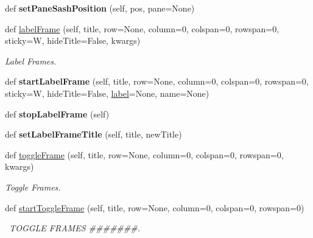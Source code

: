 \begin{DoxyCompactItemize}
def {\bfseries set\+Pane\+Sash\+Position} (self, pos, pane=None)
\item 
\mbox{\label{classappjar_1_1gui_a74ad839ae0a3437fc45379b16d98c878}} 
def \hyperlink{classappjar_1_1gui_a74ad839ae0a3437fc45379b16d98c878}{label\+Frame} (self, title, row=None, column=0, colspan=0, rowspan=0, sticky=W, hide\+Title=False, kwargs)
\begin{DoxyCompactList}\small\item\em Label Frames. \end{DoxyCompactList}\item 
\mbox{\label{classappjar_1_1gui_aa3dcc3397feb34b0aba0f35cb195757e}} 
def {\bfseries start\+Label\+Frame} (self, title, row=None, column=0, colspan=0, rowspan=0, sticky=W, hide\+Title=False, \hyperlink{classappjar_1_1gui_a161659a9096715ced2da924ab88ddecc}{label}=None, name=None)
\item 
\mbox{\label{classappjar_1_1gui_a71127df09ef0f70210975194e5a67a6f}} 
def {\bfseries stop\+Label\+Frame} (self)
\item 
\mbox{\label{classappjar_1_1gui_a12c1e3839f373ab398dc4c2f1bf37f70}} 
def {\bfseries set\+Label\+Frame\+Title} (self, title, new\+Title)
\item 
\mbox{\label{classappjar_1_1gui_a50f08eafa8b8e3d2723d71c63142b600}} 
def \hyperlink{classappjar_1_1gui_a50f08eafa8b8e3d2723d71c63142b600}{toggle\+Frame} (self, title, row=None, column=0, colspan=0, rowspan=0, kwargs)
\begin{DoxyCompactList}\small\item\em Toggle Frames. \end{DoxyCompactList}\item 
\mbox{\label{classappjar_1_1gui_a6d1b35b1c37cdf6de155a7fb97e38448}} 
def \hyperlink{classappjar_1_1gui_a6d1b35b1c37cdf6de155a7fb97e38448}{start\+Toggle\+Frame} (self, title, row=None, column=0, colspan=0, rowspan=0)
\begin{DoxyCompactList}\small\item\em  \+T\+O\+G\+G\+LE F\+R\+A\+M\+ES \#\#\#\#\#\#\#. \end{DoxyCompactList}\item 

\end{DoxyCompactItemize}
